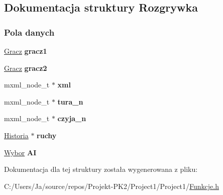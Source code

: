 \hypertarget{structRozgrywka}{}\subsection{Dokumentacja struktury Rozgrywka}
\label{structRozgrywka}
\subsubsection*{Pola danych}
\begin{DoxyCompactItemize}
\item 
\mbox{\label{structRozgrywka_a783a59da50f6c2b8313ecc1d606d6d10}} 
\mbox{\hyperlink{structGracz}{Gracz}} {\bfseries gracz1}
\item 
\mbox{\label{structRozgrywka_afad9bf29a3f620050393185fb58275f2}} 
\mbox{\hyperlink{structGracz}{Gracz}} {\bfseries gracz2}
\item 
\mbox{\label{structRozgrywka_afbd389be554d1f6682eed25899356111}} 
mxml\+\_\+node\+\_\+t $\ast$ {\bfseries xml}
\item 
\mbox{\label{structRozgrywka_a9a2eac87b74ab0d099980790ef89cb40}} 
mxml\+\_\+node\+\_\+t $\ast$ {\bfseries tura\+\_\+n}
\item 
\mbox{\label{structRozgrywka_a650a377d7f61e10f337cd7444731f854}} 
mxml\+\_\+node\+\_\+t $\ast$ {\bfseries czyja\+\_\+n}
\item 
\mbox{\label{structRozgrywka_ab43dd7158b9a34748c9ccf10c0f7827d}} 
\mbox{\hyperlink{Funkcje_8h_a11b5571e97ef883ab2d5d4ff213f79e1}{Historia}} $\ast$ {\bfseries ruchy}
\item 
\mbox{\label{structRozgrywka_a77a58ab6da28413069bd3b363d1b4144}} 
\mbox{\hyperlink{structWybor}{Wybor}} {\bfseries AI}
\end{DoxyCompactItemize}


Dokumentacja dla tej struktury została wygenerowana z pliku\+:\begin{DoxyCompactItemize}
\item 
C\+:/\+Users/\+Ja/source/repos/\+Projekt-\/\+P\+K2/\+Project1/\+Project1/\mbox{\hyperlink{Funkcje_8h}{Funkcje.\+h}}\end{DoxyCompactItemize}
